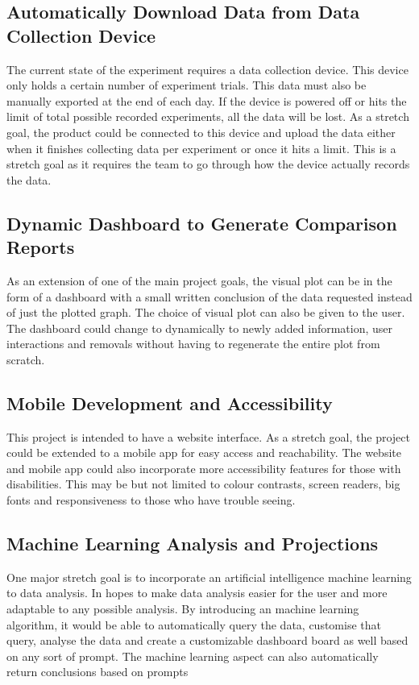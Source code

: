 \documentclass{article}
\begin{document}
\subsection*{Automatically Download Data from Data Collection Device}
The current state of the experiment requires a data collection device. This device only holds a certain number of experiment trials.
This data must also be manually exported at the end of each day. If the device is powered off or hits the limit of total possible recorded experiments, all the data will be lost.
As a stretch goal, the product could be connected to this device and upload the data either when it finishes collecting data per experiment or once it hits a limit.
This is a stretch goal as it requires the team to go through how the device actually records the data.


\subsection*{Dynamic Dashboard to Generate Comparison Reports}
As an extension of one of the main project goals, the visual plot can be in the form of a dashboard with a small written conclusion of the data requested instead of just the plotted graph.
The choice of visual plot can also be given to the user. The dashboard could change to dynamically to newly added information, user interactions and removals
without having to regenerate the entire plot from scratch.  


\subsection*{Mobile Development and Accessibility}
This project is intended to have a website interface. As a stretch goal, the project could be extended to a mobile app for
easy access and reachability. The website and mobile app could also incorporate more accessibility features for those with disabilities.
This may be but not limited to colour contrasts, screen readers, big fonts and responsiveness to those who have trouble seeing.
 
\subsection*{Machine Learning Analysis and Projections}
One major stretch goal is to incorporate an artificial intelligence machine learning to data analysis.
In hopes to make data analysis easier for the user and more adaptable to any possible analysis.
By introducing an machine learning algorithm, it would be able to automatically query the data, customise that query,
analyse the data and create a customizable dashboard board as well based on any sort of prompt. The machine learning 
aspect can also automatically return conclusions based on prompts
\end{document}
